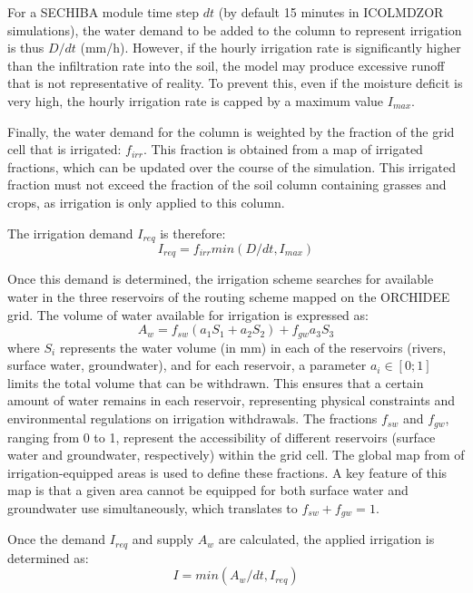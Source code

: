 For a SECHIBA module time step $dt$ (by default 15 minutes in ICOLMDZOR simulations), the water demand to be added to the column to represent irrigation is thus $D/dt$ (mm/h). However, if the hourly irrigation rate is significantly higher than the infiltration rate into the soil, the model may produce excessive runoff that is not representative of reality. To prevent this, even if the moisture deficit is very high, the hourly irrigation rate is capped by a maximum value $I_{max}$.

Finally, the water demand for the column is weighted by the fraction of the grid cell that is irrigated: $f_{irr}$. This fraction is obtained from a map of irrigated fractions, which can be updated over the course of the simulation.
This irrigated fraction must not exceed the fraction of the soil column containing grasses and crops, as irrigation is only applied to this column.

The irrigation demand $I_{req}$ is therefore:
\begin{equation}
    I_{req} = f_{irr} min(D/dt, I_{max})
\end{equation}

Once this demand is determined, the irrigation scheme searches for available water in the three reservoirs of the routing scheme mapped on the ORCHIDEE grid.
The volume of water available for irrigation is expressed as:
\begin{equation}
    A_w = f_{sw} (a_1 S_1 + a_2 S_2)+ f_{gw}a_3 S_3
\end{equation}
where $S_i$ represents the water volume (in mm) in each of the reservoirs (rivers, surface water, groundwater), and for each reservoir, a parameter $a_i \in [0;1]$ limits the total volume that can be withdrawn. This ensures that a certain amount of water remains in each reservoir, representing physical constraints and environmental regulations on irrigation withdrawals.
The fractions $f_{sw}$ and $f_{gw}$, ranging from 0 to 1, represent the accessibility of different reservoirs (surface water and groundwater, respectively) within the grid cell. The global map from \cite{siebert_groundwater_2010} of irrigation-equipped areas is used to define these fractions. A key feature of this map is that a given area cannot be equipped for both surface water and groundwater use simultaneously, which translates to $f_{sw} + f_{gw} =1$.

Once the demand $I_{req}$ and supply $A_w$ are calculated, the applied irrigation is determined as:
\begin{equation}
    I = min(A_w/dt, I_{req})
\end{equation}

